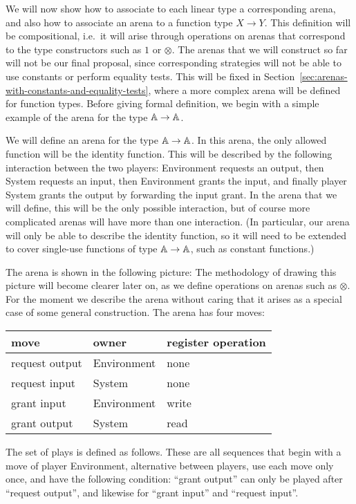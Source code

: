 We will now show how to associate to each linear type a corresponding arena, and also how to associate an arena to a function type $X \to Y$. This definition will be compositional, i.e.~it will arise through operations on arenas that correspond to the type constructors such as $1$ or $\otimes$. The arenas that we will construct so far will not be our final proposal, since corresponding strategies will not be able to use constants or perform equality tests. This will be fixed in Section~\ref{sec:arenas-with-constants-and-equality-tests}, where a more complex arena will be defined for function types. Before giving formal definition, we begin with a simple example of the arena for the type $\mathbb A \to \mathbb A$.
\begin{example}\label{ex:identity-function-without-equality-tests-and-constants}
    We will define an arena for the type $\mathbb A \to \mathbb A$. In this arena, the only allowed function will be the identity function. This will be described by the following interaction between the two players: Environment  requests an output,  then System requests an input, then Environment grants the input, and finally player System grants the output by forwarding the input grant. In the arena that we will define, this will be the only possible interaction, but of course more complicated arenas will have more than one interaction. (In particular, our arena will only be able to describe the identity function, so it will need to be extended to cover single-use functions of type $\mathbb A \to \mathbb A$, such as constant functions.)

    The arena is shown in the following picture: 
    The methodology of drawing this picture will become clearer later on, as we define operations on arenas such as $\otimes$. For the moment we describe the arena without caring that it arises as a special case of some general construction. The arena has four moves: 
    \begin{center}
        \begin{tabular}{lll}
         move & owner & register operation \\
            \hline
            request output & Environment & none \\
            request input & System & none \\
            grant input & Environment & write \\
            grant output & System & read 
        \end{tabular}    
    \end{center}
    The set of plays is defined as follows. These are all sequences that begin with a move of player Environment, alternative between players, use each move only once, and have the following condition:  ``grant output'' can only be played after ``request output'', and likewise for ``grant input'' and ``request input''.  


\end{example}
